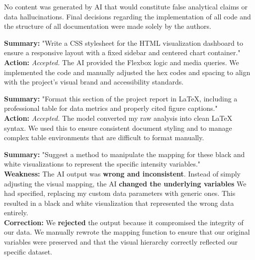 \documentclass{article}
\begin{document}
No content was generated by AI that would constitute false analytical claims or data hallucinations. Final decisions regarding the implementation of all code and the structure of all documentation were made solely by the authors.


\begin{tcolorbox}[colback=blue!5!white,colframe=blue!75!black,title={Prompt 1: CSS Dashboard Styling (Claude Sonnet)}]
\textbf{Summary:} "Write a CSS stylesheet for the HTML visualization dashboard to ensure a responsive layout with a fixed sidebar and centered chart container." \\
\textbf{Action:} \textit{Accepted.} The AI provided the Flexbox logic and media queries. We implemented the code and manually adjusted the hex codes and spacing to align with the project's visual brand and accessibility standards.
\end{tcolorbox}

\begin{tcolorbox}[colback=blue!5!white,colframe=blue!75!black,title={Prompt 2: LaTeX Report Structure (Claude Sonnet)}]
\textbf{Summary:} "Format this section of the project report in LaTeX, including a professional table for data metrics and properly cited figure captions." \\
\textbf{Action:} \textit{Accepted.} The model converted my raw analysis into clean LaTeX syntax. We used this to ensure consistent document styling and to manage complex table environments that are difficult to format manually.
\end{tcolorbox}

\begin{tcolorbox}[colback=red!5!white,colframe=red!75!black,title={Example of AI Failure \& Correction}]
\textbf{Summary:} "Suggest a method to manipulate the mapping for these black and white visualizations to represent the specific intensity variables." \\
\textbf{Weakness:} The AI output was \textbf{wrong and inconsistent}. Instead of simply adjusting the visual mapping, the AI \textbf{changed the underlying variables} We had specified, replacing my custom data parameters with generic ones. This resulted in a black and white visualization that represented the wrong data entirely. \\
\textbf{Correction:} We \textbf{rejected} the output because it compromised the integrity of our data. We manually rewrote the mapping function to ensure that our original variables were preserved and that the visual hierarchy correctly reflected our specific dataset.
\end{tcolorbox}

\end{document}
